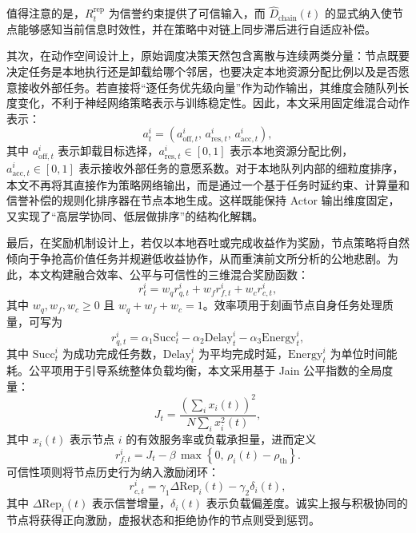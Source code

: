 \documentclass[UTF8,12pt,oneside]{ctexbook}
\begin{document}
值得注意的是，$R_t^{\mathrm{rep}}$ 为信誉约束提供了可信输入，而 $\hat{D}_{\mathrm{chain}}(t)$ 的显式纳入使节点能够感知当前信息时效性，并在策略中对链上同步滞后进行自适应补偿。

其次，在动作空间设计上，原始调度决策天然包含离散与连续两类分量：节点既要决定任务是本地执行还是卸载给哪个邻居，也要决定本地资源分配比例以及是否愿意接收外部任务。若直接将“逐任务优先级向量”作为动作输出，其维度会随队列长度变化，不利于神经网络策略表示与训练稳定性。因此，本文采用固定维混合动作表示：
\begin{equation}
  a_t^i = \left(a_{\mathrm{off},t}^i,\,a_{\mathrm{res},t}^i,\,a_{\mathrm{acc},t}^i\right),
  \label{eq:hybrid_action}
\end{equation}
其中 $a_{\mathrm{off},t}^i$ 表示卸载目标选择，$a_{\mathrm{res},t}^i\in[0,1]$ 表示本地资源分配比例，$a_{\mathrm{acc},t}^i\in[0,1]$ 表示接收外部任务的意愿系数。对于本地队列内部的细粒度排序，本文不再将其直接作为策略网络输出，而是通过一个基于任务时延约束、计算量和信誉补偿的规则化排序器在节点本地生成。这样既能保持 Actor 输出维度固定，又实现了“高层学协同、低层做排序”的结构化解耦。

最后，在奖励机制设计上，若仅以本地吞吐或完成收益作为奖励，节点策略将自然倾向于争抢高价值任务并规避低收益协作，从而重演前文所分析的公地悲剧。为此，本文构建融合效率、公平与可信性的三维混合奖励函数：
\begin{equation}
  r_t^i = w_q r_{q,t}^i + w_f r_{f,t}^i + w_c r_{c,t}^i,
  \label{eq:hybrid_reward}
\end{equation}
其中 $w_q,w_f,w_c\ge 0$ 且 $w_q+w_f+w_c=1$。效率项用于刻画节点自身任务处理质量，可写为
\begin{equation}
  r_{q,t}^i = \alpha_1\mathrm{Succ}_t^i - \alpha_2\mathrm{Delay}_t^i - \alpha_3\mathrm{Energy}_t^i,
  \label{eq:rq}
\end{equation}
其中 $\mathrm{Succ}_t^i$ 为成功完成任务数，$\mathrm{Delay}_t^i$ 为平均完成时延，$\mathrm{Energy}_t^i$ 为单位时间能耗。公平项用于引导系统整体负载均衡，本文采用基于 Jain 公平指数的全局度量\cite{ref6}：
\begin{equation}
  J_t = \frac{\left(\sum_i x_i(t)\right)^2}{N\sum_i x_i^2(t)},
  \label{eq:jain}
\end{equation}
其中 $x_i(t)$ 表示节点 $i$ 的有效服务率或负载承担量，进而定义
\begin{equation}
  r_{f,t}^i = J_t - \beta\,\max\left\{0,\,\rho_i(t)-\rho_{\mathrm{th}}\right\}.
  \label{eq:rf}
\end{equation}
可信性项则将节点历史行为纳入激励闭环：
\begin{equation}
  r_{c,t}^i = \gamma_1 \Delta \mathrm{Rep}_i(t) - \gamma_2 \delta_i(t),
  \label{eq:rc}
\end{equation}
其中 $\Delta \mathrm{Rep}_i(t)$ 表示信誉增量，$\delta_i(t)$ 表示负载偏差度。诚实上报与积极协同的节点将获得正向激励，虚报状态和拒绝协作的节点则受到惩罚。
\end{document}
